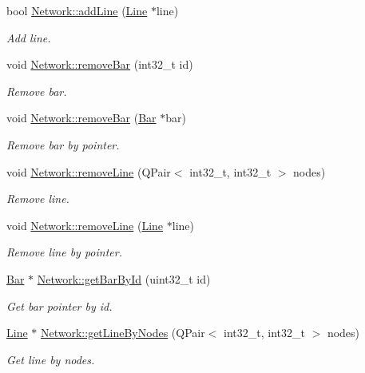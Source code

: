 \begin{DoxyCompactItemize}
bool \hyperlink{group___models_gae02945131494987b3ff9b59b627719b4}{Network\+::add\+Line} (\hyperlink{class_line}{Line} $\ast$line)
\begin{DoxyCompactList}\small\item\em Add line. \end{DoxyCompactList}\item 
void \hyperlink{group___models_ga997ce4f03d316b9f138f2e64e6ca400c}{Network\+::remove\+Bar} (int32\+\_\+t id)
\begin{DoxyCompactList}\small\item\em Remove bar. \end{DoxyCompactList}\item 
void \hyperlink{group___models_ga7dea7690987c58fa61ffaa0326b68b68}{Network\+::remove\+Bar} (\hyperlink{class_bar}{Bar} $\ast$bar)
\begin{DoxyCompactList}\small\item\em Remove bar by pointer. \end{DoxyCompactList}\item 
void \hyperlink{group___models_ga1eef3317224a7a06348fce07e581a9ad}{Network\+::remove\+Line} (Q\+Pair$<$ int32\+\_\+t, int32\+\_\+t $>$ nodes)
\begin{DoxyCompactList}\small\item\em Remove line. \end{DoxyCompactList}\item 
void \hyperlink{group___models_ga4fd51288aa75614593977ce8aab9100f}{Network\+::remove\+Line} (\hyperlink{class_line}{Line} $\ast$line)
\begin{DoxyCompactList}\small\item\em Remove line by pointer. \end{DoxyCompactList}\item 
\hyperlink{class_bar}{Bar} $\ast$ \hyperlink{group___models_ga04d524ce0fa0dd0d06deda92b1597af0}{Network\+::get\+Bar\+By\+Id} (uint32\+\_\+t id)
\begin{DoxyCompactList}\small\item\em Get bar pointer by id. \end{DoxyCompactList}\item 
\hyperlink{class_line}{Line} $\ast$ \hyperlink{group___models_ga8f090b85a7779695cb9f05b6395b3044}{Network\+::get\+Line\+By\+Nodes} (Q\+Pair$<$ int32\+\_\+t, int32\+\_\+t $>$ nodes)
\begin{DoxyCompactList}\small\item\em Get line by nodes. \end{DoxyCompactList}\item 

\end{DoxyCompactItemize}
